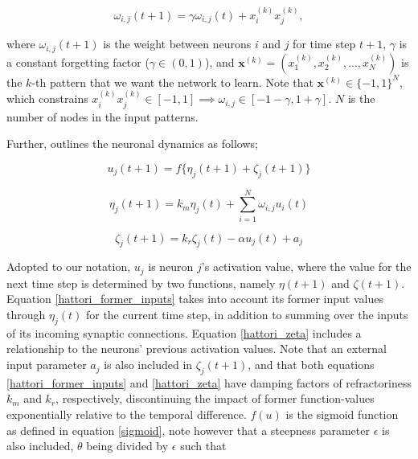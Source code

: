 \begin{equation}\label{hattori_hebbian_learning}
    \omega_{i,j}(t+1) = \gamma \omega_{i,j}(t) + x_i^{(k)} x_j^{(k)},
\end{equation}

where $\omega_{i,j}(t+1)$ is the weight between neurons $i$ and $j$ for time step $t+1$, $\gamma$ is a constant forgetting factor ($\gamma \in (0, 1)$), and $\textbf{x}^{(k)} = (x_1^{(k)}, x_2^{(k)}, ..., x_N^{(k)})$ is the $k$-th pattern that we want the network to learn. Note that $\textbf{x}^{(k)} \in \{-1,1\}^N$, which constrains $x_i^{(k)} x_j^{(k)} \in [-1,1] \implies \omega_{i,j} \in [-1-\gamma, 1+\gamma]$. $N$ is the number of nodes in the input patterns.

Further, \cite{Hattori2010} outlines the neuronal dynamics as follows;

\begin{equation}\label{hattori_next_output}
    u_j(t+1) = f\{\eta_j (t+1) + \zeta_j(t+1)\}
\end{equation}

\begin{equation}\label{hattori_former_inputs}
    \eta_j(t+1) = k_m \eta_j(t) + \sum_{i=1}^{N} \omega_{i,j} u_i(t)
\end{equation}

\begin{equation}\label{hattori_zeta}
    \zeta_j(t+1) = k_r \zeta_j(t) - \alpha u_j(t) + a_j
\end{equation}

Adopted to our notation, $u_j$ is neuron $j$'s activation value, where the value for the next time step is determined by two functions, namely $\eta(t+1)$ and $\zeta(t+1)$. Equation \ref{hattori_former_inputs} takes into account its former input values through $\eta_j(t)$ for the current time step, in addition to summing over the inputs of its incoming synaptic connections. Equation \ref{hattori_zeta} includes a relationship to the neurons' previous activation values. Note that an external input parameter $a_j$ is also included in $\zeta_j(t+1)$, and that both equations \ref{hattori_former_inputs} and \ref{hattori_zeta} have damping factors of refractoriness $k_m$ and $k_r$, respectively, discontinuing the impact of former function-values exponentially relative to the temporal difference. $f(u)$ is the sigmoid function as defined in equation \ref{sigmoid}, note however that a steepness parameter $\epsilon$ is also included, $\theta$ being divided by $\epsilon$ such that

